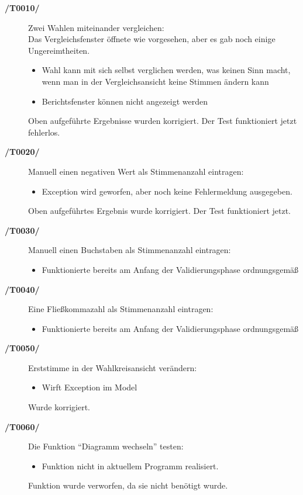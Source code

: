 \documentclass[12pt,a4paper,titlepage]{article}
\begin{document}
\begin{description}
	\item[\textbf{/T0010/}] Zwei Wahlen miteinander vergleichen: \\
	Das Vergleichsfenster öffnete wie vorgesehen, aber es gab noch einige Ungereimtheiten.
	
	\begin{itemize}
	\item Wahl kann mit sich selbst verglichen werden, was keinen Sinn macht, wenn man in der Vergleichsansicht keine Stimmen ändern kann
	\item Berichtsfenster können nicht angezeigt werden
	\end{itemize}
	
	Oben aufgeführte Ergebnisse wurden korrigiert. Der Test funktioniert jetzt fehlerlos.
	\item[\textbf{/T0020/}] Manuell einen negativen Wert als Stimmenanzahl eintragen: \\
	
	\begin{itemize}
	\item Exception wird geworfen, aber noch keine Fehlermeldung ausgegeben.
	\end{itemize}
	
	Oben aufgeführtes Ergebnis wurde korrigiert. Der Test funktioniert jetzt.
	\item[\textbf{/T0030/}] Manuell einen Buchstaben als Stimmenanzahl eintragen: \\
	
	\begin{itemize}
	\item Funktionierte bereits am Anfang der Validierungsphase ordnungsgemäß
	\end{itemize}
	
	\item[\textbf{/T0040/}] Eine Fließkommazahl als Stimmenanzahl eintragen: \\
	\begin{itemize}
	\item Funktionierte bereits am Anfang der Validierungsphase ordnungsgemäß
	\end{itemize}
	
	\item[\textbf{/T0050/}] Erststimme in der Wahlkreisansicht verändern: \\
	\begin{itemize}
	\item Wirft Exception im Model
	\end{itemize}
	Wurde korrigiert.
	\item[\textbf{/T0060/}] Die Funktion ``Diagramm wechseln'' testen:\\
	\begin{itemize}
	\item Funktion nicht in aktuellem Programm realisiert.
	\end{itemize}
	Funktion wurde verworfen, da sie nicht benötigt wurde.
	

\end{description}
\end{document}

